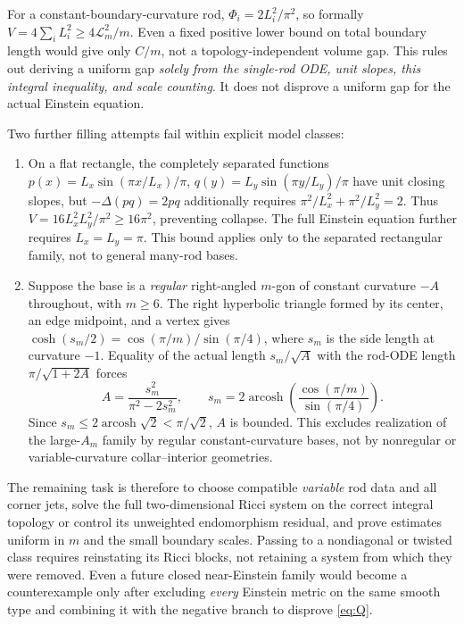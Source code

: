 \documentclass[a4paper,11pt]{article}
\numberwithin{equation}{section}
\theoremstyle{definition}
\begin{document}
For a constant-boundary-curvature rod, $\Phi_i=2L_i^2/\pi^2$, so formally
$V=4\sum_i L_i^2\ge4\mathcal L_m^2/m$.
Even a fixed positive lower bound on total boundary length would give only $C/m$, not a topology-independent volume gap.
This rules out deriving a uniform gap \emph{solely from the single-rod ODE, unit slopes, this integral inequality, and scale counting}.
It does not disprove a uniform gap for the actual Einstein equation.

Two further filling attempts fail within explicit model classes:
\begin{enumerate}
\item On a flat rectangle, the completely separated functions
$p(x)=L_x\sin(\pi x/L_x)/\pi$, $q(y)=L_y\sin(\pi y/L_y)/\pi$
have unit closing slopes, but $-\Delta(pq)=2pq$ additionally requires
$\pi^2/L_x^2+\pi^2/L_y^2=2$.
Thus $V=16L_x^2L_y^2/\pi^2\ge16\pi^2$, preventing collapse.
The full Einstein equation further requires $L_x=L_y=\pi$.
This bound applies only to the separated rectangular family, not to general many-rod bases.
\item Suppose the base is a \emph{regular} right-angled $m$-gon of constant curvature $-A$ throughout, with $m\ge6$.
The right hyperbolic triangle formed by its center, an edge midpoint, and a vertex gives
$\cosh(s_m/2)=\cos(\pi/m)/\sin(\pi/4)$,
where $s_m$ is the side length at curvature $-1$.
Equality of the actual length $s_m/\sqrt A$ with the rod-ODE length $\pi/\sqrt{1+2A}$ forces
\begin{equation}\label{eq:toric-regular-polygon}
 A=\frac{s_m^2}{\pi^2-2s_m^2},\qquad
 s_m=2\operatorname{arcosh}\!\left(\frac{\cos(\pi/m)}{\sin(\pi/4)}\right).
\end{equation}
Since $s_m\le2\operatorname{arcosh}\sqrt2<\pi/\sqrt2$, $A$ is bounded.
This excludes realization of the large-$A_m$ family by regular constant-curvature bases, not by nonregular or variable-curvature collar--interior geometries.
\end{enumerate}

The remaining task is therefore to choose compatible \emph{variable} rod data and all corner jets, solve the full two-dimensional Ricci system on the correct integral topology or control its unweighted endomorphism residual, and prove estimates uniform in $m$ and the small boundary scales.
Passing to a nondiagonal or twisted class requires reinstating its Ricci blocks, not retaining a system from which they were removed.
Even a future closed near-Einstein family would become a counterexample only after excluding \emph{every} Einstein metric on the same smooth type and combining it with the negative branch to disprove \eqref{eq:Q}.
\end{document}
